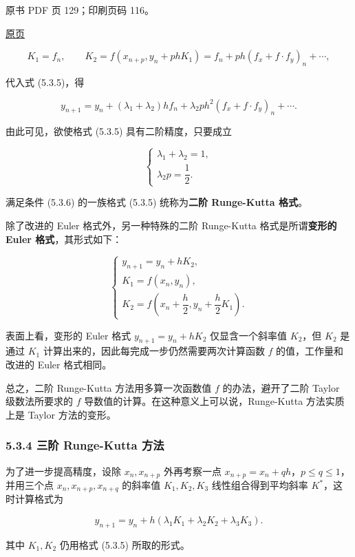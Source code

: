 \clearpage

原书 PDF 页 129；印刷页码 116。

\href{source-images/pdf-129.jpeg}{原页}

\[
K_1=f_n,\qquad K_2=f(x_{n+p},y_n+phK_1)=f_n+ph(f_x+f\cdot f_y)_n+\cdots,
\]

代入式 (5.3.5)，得

\[
y_{n+1}=y_n+(\lambda_1+\lambda_2)hf_n+\lambda_2ph^2(f_x+f\cdot f_y)_n+\cdots.
\]

由此可见，欲使格式 (5.3.5) 具有二阶精度，只要成立

\[
\begin{cases}
\lambda_1+\lambda_2=1,\\
\lambda_2p=\dfrac{1}{2}.
\end{cases}\tag{5.3.6}
\]

满足条件 (5.3.6) 的一族格式 (5.3.5) 统称为\textbf{二阶 Runge-Kutta 格式}。

除了改进的 Euler 格式外，另一种特殊的二阶 Runge-Kutta 格式是所谓\textbf{变形的 Euler 格式}，其形式如下：

\[
\begin{cases}
y_{n+1}=y_n+hK_2,\\
K_1=f(x_n,y_n),\\
K_2=f\left(x_n+\dfrac{h}{2},y_n+\dfrac{h}{2}K_1\right).
\end{cases}
\]

表面上看，变形的 Euler 格式 \(y_{n+1}=y_n+hK_2\) 仅显含一个斜率值 \(K_2\)，但 \(K_2\) 是通过 \(K_1\) 计算出来的，因此每完成一步仍然需要两次计算函数 \(f\) 的值，工作量和改进的 Euler 格式相同。

总之，二阶 Runge-Kutta 方法用多算一次函数值 \(f\) 的办法，避开了二阶 Taylor 级数法所要求的 \(f\) 导数值的计算。在这种意义上可以说，Runge-Kutta 方法实质上是 Taylor 方法的变形。

\subsubsection{5.3.4 三阶 Runge-Kutta 方法}\label{ch05a-ux4e09ux9636-runge-kutta-ux65b9ux6cd5}

为了进一步提高精度，设除 \(x_n,x_{n+p}\) 外再考察一点 \(x_{n+p}=x_n+qh\)，\(p\leqslant q\leqslant1\)，并用三个点 \(x_n,x_{n+p},x_{n+q}\) 的斜率值 \(K_1,K_2,K_3\) 线性组合得到平均斜率 \(K^*\)，这时计算格式为

\[
y_{n+1}=y_n+h(\lambda_1K_1+\lambda_2K_2+\lambda_3K_3).
\]

其中 \(K_1,K_2\) 仍用格式 (5.3.5) 所取的形式。

